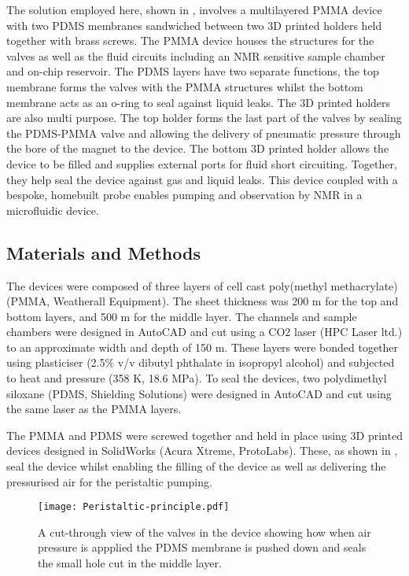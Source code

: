 The solution employed here, shown in , involves a multilayered PMMA device
with two PDMS membranes sandwiched between two 3D printed holders held together with brass
screws. The PMMA device houses the structures for the valves as well as the fluid circuits
including an NMR sensitive sample chamber and on-chip reservoir. The PDMS layers have two
separate functions, the top membrane forms the valves with the PMMA structures whilst the
bottom membrane acts as an o-ring to seal against liquid leaks. The 3D printed holders
are also multi purpose. The top holder forms the last part of the valves by sealing the
PDMS-PMMA valve and allowing the delivery of pneumatic pressure through the bore of the
magnet to the device. The bottom 3D printed holder allows the device to be filled and
supplies external ports for fluid short circuiting. Together, they help seal the device
against gas and liquid leaks. This device coupled with a bespoke, homebuilt probe enables
pumping and observation by NMR in a microfluidic device.


\subsection{Materials and Methods}

The devices were composed of three layers of cell cast poly(methyl methacrylate) (PMMA,
Weatherall Equipment). The sheet thickness was 200 \mu m for the top and bottom layers, and 500 \mu m for
the middle layer. The channels and sample chambers were designed in
AutoCAD and cut using a CO2 laser (HPC Laser ltd.) to an approximate width and depth
of 150 \mu m. These layers were bonded together using plasticiser (2.5\% v/v dibutyl
phthalate in isopropyl alcohol) and subjected to heat and pressure (358 K, 18.6 MPa).
To seal the devices, two polydimethyl siloxane (PDMS, Shielding Solutions) were
designed in AutoCAD and cut using the same laser as the PMMA layers.

The PMMA and PDMS were screwed together and held in place using 3D printed devices
designed in SolidWorks (Acura Xtreme, ProtoLabs). These, as shown in , seal the
device whilst enabling the filling of the device as well as delivering the pressurised
air for the peristaltic pumping.

\begin{figure}
  \begin{center}
  \texttt{[image: Peristaltic-principle.pdf]}
  \caption{A cut-through view of the valves in the device showing how when air pressure is
  appplied the PDMS membrane is pushed down and seals the small hole cut in the middle layer.}
  \label{fig:PP-device}
  \end{center}
\end{figure}

